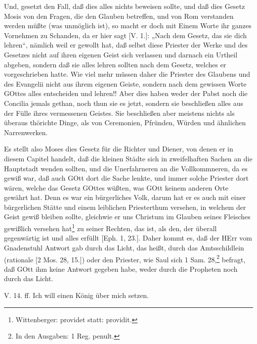 Und, gesetzt den Fall, daß dies alles nichts beweisen sollte, und daß dies Gesetz Mosis von den Fragen, die den Glauben betreffen, und von Rom verstanden werden müßte (was unmöglich ist), so macht er doch mit Einem Worte ihr ganzes Vornehmen zu Schanden, da er hier sagt [V. 1.]: „Nach dem Gesetz, das sie dich lehren“, nämlich weil er gewollt hat, daß selbst diese Priester der Werke und des Gesetzes nicht auf ihren eigenen Geist sich verlassen und darnach ein Urtheil abgeben, sondern daß sie alles lehren sollten nach dem Gesetz, welches er vorgeschrieben hatte. Wie viel mehr müssen daher die Priester des Glaubens und des Evangelii nicht aus ihrem eigenen Geiste, sondern nach dem gewissen Worte GOttes alles entscheiden und lehren!! Aber dies haben weder der Pabst noch die Concilia jemals gethan, noch thun sie es jetzt, sondern sie beschließen alles aus der Fülle ihres vermessenen Geistes. Sie beschließen aber meistens nichts als überaus thörichte Dinge, als von Ceremonien, Pfründen, Würden und ähnlichen Narrenwerken.

Es stellt also Moses dies Gesetz für die Richter und Diener, von denen er in diesem Capitel handelt, daß die kleinen Städte sich in zweifelhaften Sachen an die Hauptstadt wenden sollten, und die Unerfahrneren an die Vollkommneren, da es gewiß war, daß auch GOtt dort die Sache lenkte, und immer solche Priester dort wären, welche das Gesetz GOttes wüßten, was GOtt keinem anderen Orte gewährt hat. Denn es war ein bürgerliches Volk, darum hat er es auch mit einer bürgerlichen Stätte und einem leiblichen Priesterthum versehen, in welchem der Geist gewiß bleiben sollte, gleichwie er uns Christum im Glauben seines Fleisches gewißlich versehen hat\footnote{Wittenberger: providet statt: providit.} zu seiner Rechten, das ist, als den, der überall gegenwärtig ist und alles erfüllt [Eph. 1, 23.]. Daher kommt es, daß der HErr vom Gnadenstuhl Antwort gab durch das Licht, das heißt, durch das Amtsschildlein (rationale [2 Mos. 28, 15.]) oder den Priester, wie Saul sich 1 Sam. 28,\footnote{In den Ausgaben: 1 Reg. penult.} befragt, daß GOtt ihm keine Antwort gegeben habe, weder durch die Propheten noch durch das Licht.

\begin{schriftzitat}
V. 14. ff. Ich will einen König über mich setzen.
\end{schriftzitat}

